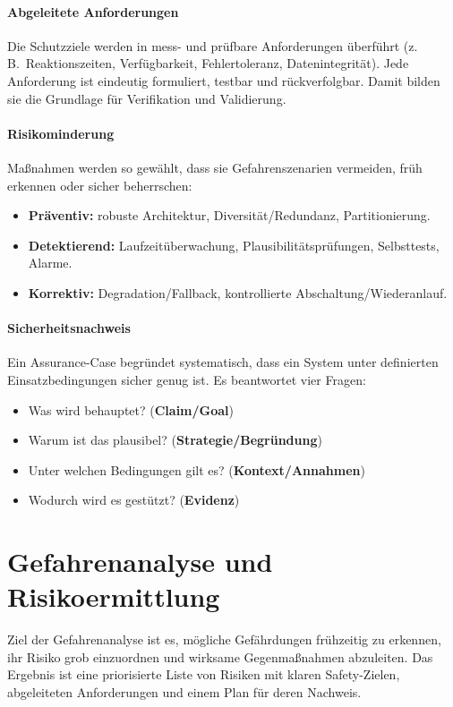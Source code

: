 \paragraph{Abgeleitete Anforderungen}
Die Schutzziele werden in mess- und prüfbare Anforderungen überführt
(z.\,B.\ Reaktionszeiten, Verfügbarkeit, Fehlertoleranz, Datenintegrität).
Jede Anforderung ist eindeutig formuliert, testbar und rückverfolgbar. 
Damit bilden sie die Grundlage für Verifikation und Validierung.

\paragraph{Risikominderung}
Maßnahmen werden so gewählt, dass sie Gefahrenszenarien vermeiden, früh erkennen
oder sicher beherrschen:
\begin{itemize}
  \item \textbf{Präventiv:} robuste Architektur, Diversität/Redundanz, Partitionierung.
  \item \textbf{Detektierend:} Laufzeitüberwachung, Plausibilitätsprüfungen, Selbsttests, Alarme.
  \item \textbf{Korrektiv:} Degradation/Fallback, kontrollierte Abschaltung/Wiederanlauf.
\end{itemize}

\paragraph{Sicherheitsnachweis}
Ein Assurance-Case begründet systematisch, dass ein System unter definierten Einsatzbedingungen
sicher genug ist. Es beantwortet vier Fragen:
\begin{itemize}
  \item Was wird behauptet? \hfill(\textbf{Claim/Goal})
  \item Warum ist das plausibel? \hfill(\textbf{Strategie/Begründung})
  \item Unter welchen Bedingungen gilt es? \hfill(\textbf{Kontext/Annahmen})
  \item Wodurch wird es gestützt? \hfill(\textbf{Evidenz})
\end{itemize}


\section{Gefahrenanalyse und Risikoermittlung}\label{sec:hazard-risk}
Ziel der Gefahrenanalyse ist es, mögliche Gefährdungen frühzeitig zu erkennen, ihr Risiko grob einzuordnen
und wirksame Gegenmaßnahmen abzuleiten. Das Ergebnis ist eine priorisierte Liste von Risiken mit klaren
Safety-Zielen, abgeleiteten Anforderungen und einem Plan für deren Nachweis.

